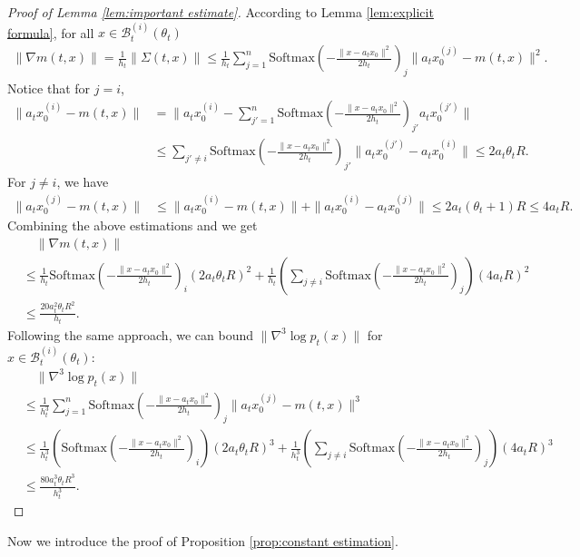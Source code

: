 \documentclass[11pt]{article}
\newcommand{\mc}{\mathcal}
\newcommand{\Softmax}{\mathrm{Softmax}}
\begin{document}
\begin{proof}[Proof of Lemma \ref{lem:important estimate}] According to Lemma \ref{lem:explicit formula}, for all $x\in \mc{B}_{t}^{(i)}(\theta_{t})$
\begin{align*}
    \| \nabla m(t,x) \| = \frac{1}{h_t}\| \Sigma(t,x) \| \le \frac{1}{h_t} \sum_{j=1}^n \Softmax(-\frac{\| x-a_{t}x_0 \|^2}{2h_{t}})_j \| a_t x_0^{(j)} - m(t,x) \|^2.
\end{align*}
Notice that for $j= i$,
\begin{align*}
    \| a_t x_0^{(i)} - m(t,x) \| & = \| a_t x_0^{(i)} - \sum_{j'=1}^n  \Softmax(-\frac{\| x-a_{t}x_0 \|^2}{2h_{t}})_{j'} a_t x_0^{(j')}  \| \\
     & \le \sum_{j'\neq i} \Softmax(-\frac{\| x-a_{t}x_0 \|^2}{2h_{t}})_{j'}  \| a_t x_0^{(j')} - a_t x_0^{(i)}\| \le 2a_t \theta_t R.
\end{align*}
For $j\neq i$, we have
\begin{align*}
    \| a_t x_0^{(j)} - m(t,x) \| & \le  \| a_t x_0^{(i)} - m(t,x) \| + \| a_t x_0^{(i)} - a_t x_0^{(j)} \| \le 2a_t (\theta_t+1) R\le 4a_tR.
\end{align*}
Combining the above estimations and we get
\begin{align*}
    &\quad \| \nabla m(t,x)\| \\
    & \le \frac{1}{h_t} \Softmax(-\frac{\| x-a_{t}x_0 \|^2}{2h_{t}})_{i}(2a_t\theta_t R)^2 + \frac{1}{h_t} (\sum_{j\neq i} \Softmax(-\frac{\| x-a_{t}x_0 \|^2}{2h_{t}})_{j}  ) (4a_t R)^2 \\&\le \frac{20a_t^2 \theta_t R^2}{h_t}.
\end{align*}
Following the same approach, we can bound $\|\nabla^3\log p_t (x)\|$ for $x\in \mc{B}_{t}^{(i)}(\theta_{t})$:
\begin{align*}
    &\quad\| \nabla^3\log p_t(x) \|\\
    & \le \frac{1}{h_t^3} \sum_{j=1}^n \Softmax(-\frac{\| x-a_{t}x_0 \|^2}{2h_{t}})_j \| a_t x_0^{(j)} - m(t,x) \|^3\\
    & \le \frac{1}{h_t^3} (\Softmax(-\frac{\| x-a_{t}x_0 \|^2}{2h_{t}})_{i}) (2a_t\theta_t R)^3 + \frac{1}{h_t^3} (\sum_{j\neq i} \Softmax(-\frac{\| x-a_{t}x_0 \|^2}{2h_{t}})_{j}  ) (4a_t R)^3 \\
    &\le \frac{80a_t^3 \theta_t R^3}{h_t^3}.
\end{align*}
\end{proof}
Now we introduce the proof of Proposition \ref{prop:constant estimation}.
\end{document}
